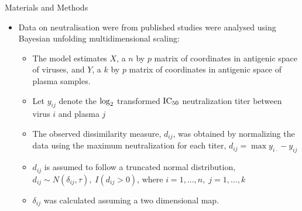 \documentclass[final]{beamer}
\begin{document}
\begin{frame}{}
\begin{textblock}{40}
\begin{block}{Materials and Methods}
\begin{itemize}
\item{Data on neutralisation were from published studies were analysed using Bayesian unfolding multidimensional scaling:}
\begin{itemize}
\item{The model estimates $X$, a $n$ by $p$ matrix of coordinates in antigenic space of viruses, and  $Y$, a $k$ by $p$ matrix of coordinates in antigenic space of plasma samples.}
\item{Let $y_{ij}$ denote the ${\rm log}_2$ transformed ${\rm IC}_{50}$ neutralization titer between virus $i$ and plasma $j$}
\item{The observed dissimilarity measure, $d_{ij}$, was obtained by normalizing the data using the maximum neutralization for each titer, $d_{ij}=\max y_{i \cdot} - y_{ij}$}
\item{$d_{ij}$ is assumed to follow a truncated normal distribution, $d_{ij}\sim N (\delta_{ij}, \tau),\;I(d_{ij}>0)$, where $i=1, \ldots ,n,\;j=1,\ldots,k$}
\item{$\delta_{ij}$ was calculated assuming a two dimensional map.}
\end{itemize}
\end{itemize}
\end{block}


\end{textblock}
\end{frame}
\end{document}
